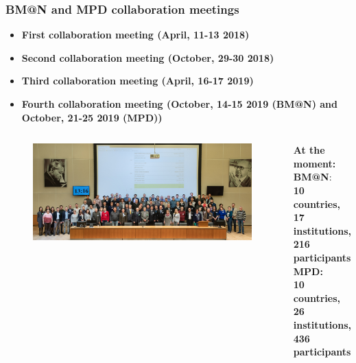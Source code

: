 \documentclass[dvipsnames] {beamer}
\begin{document}
\begin{frame}
  \frametitle{\bf \centering \footnotesize BM@N and MPD collaboration meetings}
  
  \begin{block}{}
    \begin{itemize}
    \item \bf \centering \scriptsize First collaboration meeting {\color{red} (April, 11-13 2018)}
    \item \bf \centering \scriptsize Second collaboration meeting {\color{red} (October, 29-30 2018)}
    \item \bf \centering \scriptsize Third collaboration meeting {\color{red} (April, 16-17 2019)}
    \item \bf \centering \scriptsize Fourth collaboration meeting {\color{red} (October, 14-15 2019 (BM@N) and October, 21-25 2019 (MPD))}
    \end{itemize}
   \end{block}
  \begin{columns}[c]   
     \begin{block}{}
       \begin{figure}[H]
         \includegraphics[width=1.\linewidth]{third_collab.jpg}
       \end{figure}
     \end{block}
     
     {\footnotesize 
  \begin{block}{\bf \centering \footnotesize At the moment:}
    {\bf \color{red} BM@N}: \\ \bf	10 countries, \\ 17 institutions, \\ 216 participants \\    
    {\bf \color{blue} MPD}: \\ \bf	10 countries, \\ 26 institutions, \\ 436 participants   
  \end{block}
  }
  \end{columns}
 
\end{frame}
\end{document}
